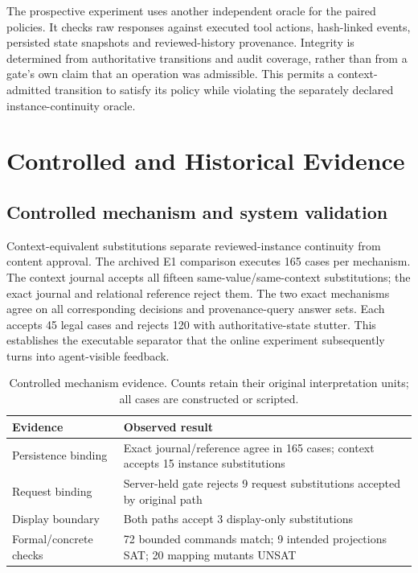 \documentclass[10pt,a4paper,twocolumn]{article}
\begin{document}
The prospective experiment uses another independent oracle for the paired policies. It checks raw responses against executed tool actions, hash-linked events, persisted state snapshots and reviewed-history provenance. Integrity is determined from authoritative transitions and audit coverage, rather than from a gate's own claim that an operation was admissible. This permits a context-admitted transition to satisfy its policy while violating the separately declared instance-continuity oracle.

\section{Controlled and Historical Evidence}
\subsection{Controlled mechanism and system validation}
Context-equivalent substitutions separate reviewed-instance continuity from content approval. The archived E1 comparison executes 165 cases per mechanism. The context journal accepts all fifteen same-value/same-context substitutions; the exact journal and relational reference reject them. The two exact mechanisms agree on all corresponding decisions and provenance-query answer sets. Each accepts 45 legal cases and rejects 120 with authoritative-state stutter. This establishes the executable separator that the online experiment subsequently turns into agent-visible feedback.

\begin{table}[t]
\centering\small
\caption{Controlled mechanism evidence. Counts retain their original interpretation units; all cases are constructed or scripted.}
\label{tab:controlled}
\begin{tabularx}{\columnwidth}{@{}lX@{}}
\toprule
Evidence & Observed result \\
\midrule
Persistence binding & Exact journal/reference agree in 165 cases; context accepts 15 instance substitutions \\
Request binding & Server-held gate rejects 9 request substitutions accepted by original path \\
Display boundary & Both paths accept 3 display-only substitutions \\
Formal/concrete checks & 72 bounded commands match; 9 intended projections SAT; 20 mapping mutants UNSAT \\
\bottomrule
\end{tabularx}
\end{table}
\end{document}
